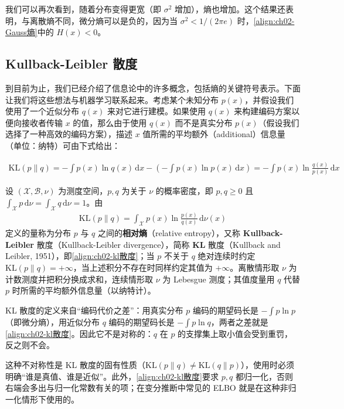 \documentclass[../../main.tex]{subfiles}
\begin{document}
我们可以再次看到，随着分布变得更宽（即 $\sigma^{2}$ 增加），熵也增加。这个结果还表明，与离散熵不同，微分熵可以是负的，因为当 $\sigma^{2}<1/(2\pi e)$ 时，\eqref{align:ch02-Gauss熵}中的 $H(x)<0$。

\subsection{Kullback-Leibler 散度}\label{subsection:ch02-KL散度}

到目前为止，我们已经介绍了信息论中的许多概念，包括熵的关键符号表示。下面让我们将这些想法与机器学习联系起来。考虑某个未知分布 $p(x)$，并假设我们使用了一个近似分布 $q(x)$ 来对它进行建模。如果使用 $q(x)$ 来构建编码方案以便向接收者传输 $x$ 的值，那么由于使用 $q(x)$ 而不是真实分布 $p(x)$（假设我们选择了一种高效的编码方案），描述 $x$ 值所需的平均额外（additional）信息量（单位：纳特）可由下式给出：

\begin{align}
  \mathrm{KL}(p\|q) = -\int p(x)\ln q(x)\,\mathrm{d}x - \left(-\int p(x)\ln p(x)\,\mathrm{d}x\right) = -\int p(x)\ln\frac{q(x)}{p(x)}\,\mathrm{d}x
  \label{align:ch02-kl散度}
\end{align}

\begin{definition}\label{definition:ch02-kl散度}
设 $(\mathcal{X},\mathcal{B},\nu)$ 为测度空间，$p,q$ 为关于 $\nu$ 的概率密度，即 $p,q\geqslant0$ 且 $\int_{\mathcal{X}}p\,\mathrm{d}\nu=\int_{\mathcal{X}}q\,\mathrm{d}\nu=1$。由
\begin{align*}
  \mathrm{KL}(p\|q)=\int_{\mathcal{X}}p(x)\ln\frac{p(x)}{q(x)}\,\mathrm{d}\nu(x)
\end{align*}
定义的量称为分布 $p$ 与 $q$ 之间的\textbf{相对熵}（relative entropy），又称 \textbf{Kullback-Leibler} 散度（Kullback-Leibler divergence），简称 \textbf{KL} 散度（Kullback and Leibler, 1951），即\eqref{align:ch02-kl散度}；当 $p$ 不关于 $q$ 绝对连续时约定 $\mathrm{KL}(p\|q)=+\infty$，当上述积分不存在时同样约定其值为 $+\infty$。离散情形取 $\nu$ 为计数测度并把积分换成求和，连续情形取 $\nu$ 为 Lebesgue 测度；其值度量用 $q$ 代替 $p$ 时所需的平均额外信息量（以纳特计）。
\end{definition}

\begin{remark}
KL 散度的定义来自“编码代价之差”：用真实分布 $p$ 编码的期望码长是 $-\int p\ln p$（即微分熵），用近似分布 $q$ 编码的期望码长是 $-\int p\ln q$，两者之差就是\eqref{align:ch02-kl散度}。因此它不是对称的：$q$ 在 $p$ 的支撑集上取小值会受到重罚，反之则不会。

这种不对称性是 KL 散度的固有性质（$\mathrm{KL}(p\|q)\neq\mathrm{KL}(q\|p)$），使用时必须明确“谁是真值、谁是近似”。此外，\eqref{align:ch02-kl散度}要求 $p,q$ 都归一化，否则右端会多出与归一化常数有关的项；在变分推断中常见的 ELBO 就是在这种非归一化情形下使用的。
\end{remark}
\end{document}
